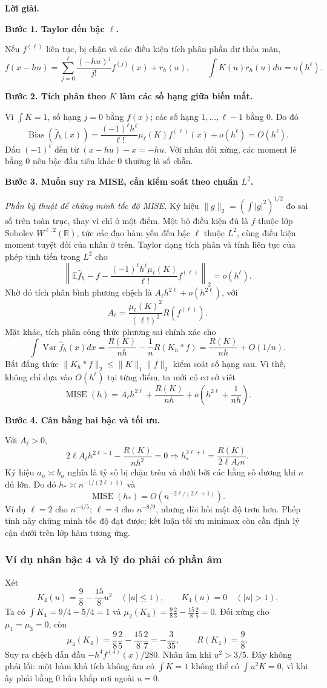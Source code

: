 \documentclass[11pt,a4paper]{article}
\DeclareMathOperator{\MISE}{MISE}
\newcommand{\E}{\mathbb E}
\newcommand{\R}{\mathbb R}
\newcommand{\fh}{\widehat f_h}
\DeclareMathOperator{\Var}{Var}
\DeclareMathOperator{\Bias}{Bias}
\newcommand{\buoc}[1]{\par\medskip\textbf{#1}\par}
\begin{document}
\textbf{Lời giải.}

\buoc{Bước 1. Taylor đến bậc $\ell$.}
Nếu $f^{(\ell)}$ liên tục, bị chặn và các điều kiện tích phân phần dư thỏa mãn,
\[
 f(x-hu)=\sum_{j=0}^{\ell}\frac{(-hu)^j}{j!}f^{(j)}(x)+r_h(u),
 \qquad \int K(u)r_h(u)du=o(h^\ell).
\]
\buoc{Bước 2. Tích phân theo $K$ làm các số hạng giữa biến mất.}
Vì $\int K=1$, số hạng $j=0$ bằng $f(x)$; các số hạng $1,\ldots,\ell-1$ bằng 0. Do đó
\[
\boxed{\Bias(\fh(x))=\frac{(-1)^\ell h^\ell}{\ell!}\mu_\ell(K)f^{(\ell)}(x)+o(h^\ell)=O(h^\ell).}
\]
Dấu $(-1)^\ell$ đến từ $(x-hu)-x=-hu$. Với nhân đối xứng, các moment lẻ bằng 0 nên bậc đầu tiên khác 0 thường là số chẵn.

\buoc{Bước 3. Muốn suy ra MISE, cần kiểm soát theo chuẩn $L^2$.}
\textit{Phần kỹ thuật để chứng minh tốc độ MISE.} Ký hiệu $\|g\|_2=(\int|g|^2)^{1/2}$ đo sai số trên toàn trục, thay vì chỉ ở một điểm. Một bộ điều kiện đủ là $f$ thuộc lớp Sobolev $W^{\ell,2}(\R)$, tức các đạo hàm yếu đến bậc $\ell$ thuộc $L^2$, cùng điều kiện moment tuyệt đối của nhân ở trên. Taylor dạng tích phân và tính liên tục của phép tịnh tiến trong $L^2$ cho
\[
\left\|\E\fh-f-\frac{(-1)^\ell h^\ell\mu_\ell(K)}{\ell!}f^{(\ell)}\right\|_2=o(h^\ell).
\]
Nhờ đó tích phân bình phương chệch là $A_\ell h^{2\ell}+o(h^{2\ell})$, với
\[
A_\ell=\frac{\mu_\ell(K)^2}{(\ell!)^2}R(f^{(\ell)}).
\]
Mặt khác, tích phân công thức phương sai chính xác cho
\[
\int\Var\fh(x)dx=\frac{R(K)}{nh}-\frac1nR(K_h*f)
=\frac{R(K)}{nh}+O(1/n).
\]
Bất đẳng thức $\|K_h*f\|_2\leq\|K\|_1\|f\|_2$ kiểm soát số hạng sau. Vì thế, không chỉ dựa vào $O(h^\ell)$ tại từng điểm, ta mới có cơ sở viết
\[
\MISE(h)=A_\ell h^{2\ell}+\frac{R(K)}{nh}+o\!\left(h^{2\ell}+\frac1{nh}\right).
\]

\buoc{Bước 4. Cân bằng hai bậc và tối ưu.}
Với $A_\ell>0$,
\[
2\ell A_\ell h^{2\ell-1}-\frac{R(K)}{nh^2}=0
\Longrightarrow h_*^{2\ell+1}=\frac{R(K)}{2\ell A_\ell n}.
\]
Ký hiệu $a_n\asymp b_n$ nghĩa là tỷ số bị chặn trên và dưới bởi các hằng số dương khi $n$ đủ lớn. Do đó $h_*\asymp n^{-1/(2\ell+1)}$ và
\[
\boxed{\MISE(h_*)=O\!\left(n^{-2\ell/(2\ell+1)}\right).}
\]
Ví dụ $\ell=2$ cho $n^{-4/5}$; $\ell=4$ cho $n^{-8/9}$, nhưng đòi hỏi mật độ trơn hơn. Phép tính này chứng minh tốc độ đạt được; kết luận tối ưu minimax còn cần định lý cận dưới trên lớp hàm tương ứng.

\subsubsection*{Ví dụ nhân bậc 4 và lý do phải có phần âm}
Xét
\[
K_4(u)=\frac98-\frac{15}{8}u^2\quad(|u|\leq1),\qquad K_4(u)=0\quad(|u|>1).
\]
Ta có $\int K_4=9/4-5/4=1$ và
$\mu_2(K_4)=\frac98\frac23-\frac{15}{8}\frac25=0$. Đối xứng cho $\mu_1=\mu_3=0$, còn
\[
\mu_4(K_4)=\frac98\frac25-\frac{15}{8}\frac27=-\frac3{35},\qquad R(K_4)=\frac98.
\]
Suy ra chệch dẫn đầu $-h^4 f^{(4)}(x)/280$. Nhân âm khi $u^2>3/5$. Đây không phải lỗi: một hàm khả tích không âm có $\int K=1$ không thể có $\int u^2K=0$, vì khi ấy phải bằng 0 hầu khắp nơi ngoài $u=0$.
\end{document}
